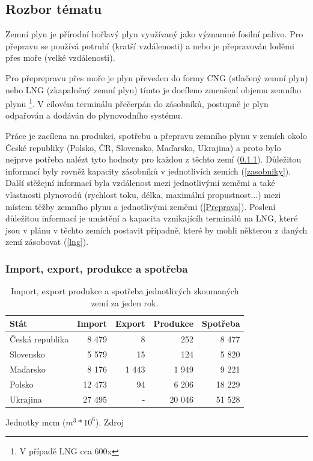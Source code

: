 \documentclass[a4paper,11pt]{article}
\begin{document}
\subsection{Rozbor tématu}\label{Rozbor}

Zemní plyn je přírodní hořlavý plyn využívaný jako významné fosilní palivo.
Pro přepravu se používá potrubí (kratší vzdálenosti) a nebo je 
přepravován loděmi přes moře (velké vzdálenosti).

Pro přeprepravu přes moře je plyn převeden do formy CNG (stlačený zemní plyn) nebo
LNG (zkapalněný zemní plyn) tímto je docíleno zmenšení objemu zemního plynu \footnote{V případě LNG cca 600x}. V cílovém terminálu přečerpán do zásobníků, postupně je plyn odpařován a dodáván do plynovodního systému.


\vline

Práce je zacílena na produkci, spotřebu a přepravu zemního plynu v zemích okolo
České republiky (Polsko, ČR, Slovensko, Maďarsko, Ukrajina) a proto bylo nejprve potřeba
nalézt tyto hodnoty pro každou z těchto zemí (\ref{Zeme}). 
Důležitou informací byly rovněž kapacity zásobníků v jednotlivích zemích (\ref{zasobniky}).
Další stěžejní informací byla vzdálenost mezi jednotlivými zeměmi a také vlastnosti
plynovodů (rychlost toku, délka, maximální propustnost...)
mezi místem těžby zemního plynu a jednotlivými zeměmi (\ref{Preprava}).
Poslení důležitou informací je umístění a kapacita vznikajícíh terminálů na LNG,
které jsou v plánu v těchto zemích postavit případně, které by mohli některou z
daných zemí zásobovat (\ref{lng}).



\subsubsection{Import, export, produkce a spotřeba}\label{Zeme}
\begin{table}[h!]
\begin{center}
\begin{tabular}{|l|r|r|r|r|}
    \hline
    Stát 			& Import 	& Export & Produkce & Spotřeba \\
    \hline 
    Česká republika	& 8 479 		& 8 		& 252	& 8 477\\ 
    Slovensko 		& 5 579		& 15		& 124	& 5 820\\
    Maďarsko 		& 8 176		& 1 443	& 1 949	& 9 221\\
    Polsko 			& 12 473 	& 94 	& 6 206	& 18 229\\
    Ukrajina 		& 27 495 	& -		& 20 046 & 51 528 \\ \hline
\end{tabular}
\caption{Import, export produkce a spotřeba jednotlivých zkoumaných zemí za jeden rok.}
Jednotky mcm ($m^3 * 10^6$).  Zdroj \cite{IEA}
\label{rocni}
\end{center}
\end{table}
\end{document}
